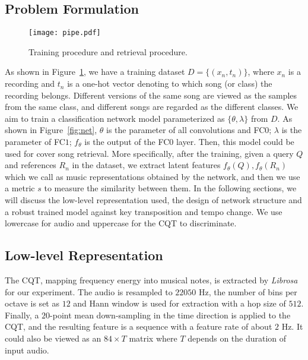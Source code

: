 \documentclass{article}
\newcommand{\figref}[1]{\mbox{Figure~\ref{#1}}}
\begin{document}
\subsection{Problem Formulation}
\begin{figure}
	\centering
	\texttt{[image: pipe.pdf]}
	\caption{Training procedure and retrieval procedure.}
	\label{fig:pipe}
\end{figure}
As shown in \figref{fig:pipe}, we have a training dataset $D = \{(x_n, t_n)\}$, where $x_n$ is a recording and $t_n$ is a one-hot vector denoting to which song (or class) the recording belongs. Different versions of the same song are viewed as the samples from the same class, and different songs are regarded as the different classes. We aim to train a classification network model parameterized as $\{\theta,\lambda\}$ from $D$. As shown in \figref{fig:net}, $\theta$ is the parameter of all convolutions and FC$0$; $\lambda$ is the parameter of FC$1$; $f_\theta$ is the output of the FC$0$ layer. Then, this model could be used for cover song retrieval. More specifically, after the training, given a query $Q$ and references ${R_n}$ in the dataset, we extract latent features $f_\theta(Q),  {f_\theta(R_n)}$ which we call as music representations obtained by the network, and then we use a metric $s$ to measure the similarity between them. In the following sections, we will discuss the low-level representation used, the design of network structure and a robust trained model against key transposition and tempo change. We use lowercase for audio and uppercase for the CQT to discriminate.



\subsection{Low-level Representation}
The CQT, mapping frequency energy into musical notes, is extracted by \textit{Librosa} \cite{mcfee2015librosa} for our experiment. The audio is resampled to $22050$ Hz, the number of bins per octave is set as $12$ and Hann window is used for extraction with a hop size of $512$. Finally, a $20$-point mean down-sampling in the time direction is applied to the CQT, and the resulting feature is a sequence with a feature rate of about $2$ Hz. It could also be viewed as an $84 \times T$ matrix where $T$ depends on the duration of input audio.
\end{document}
